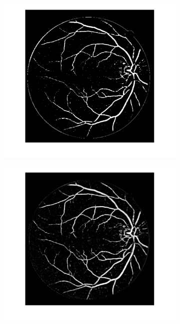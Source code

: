 \documentclass[12pt, notitlepage]{article}
\begin{document}
\begin{figure}[H]
\centering
\begin{subfigure}{0.4\columnwidth}
\includegraphics[width=\columnwidth]{figures/rslt_knn}
\caption{}
\label{fig:}
\end{subfigure}
\begin{subfigure}{0.4\columnwidth}
\includegraphics[width=\columnwidth]{figures/rslt_knn_mean}

\end{subfigure}
\end{figure}
\end{document}
